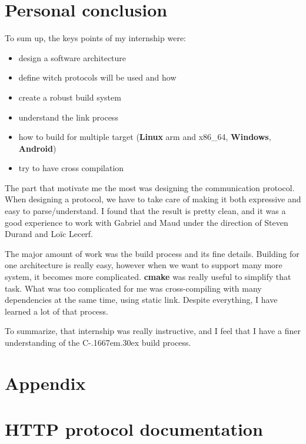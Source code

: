 \documentclass[a4paper,11pt]{custom}
\newcommand{\cmake}{\textbf{cmake}\xspace}
\newcommand{\linux}{\textbf{Linux}\xspace}
\newcommand{\win}{\textbf{Windows}\xspace}
\newcommand{\android}{\textbf{Android}\xspace}
\newcommand{\cpp}{%
  C\kern-.1667em\raise.30ex\hbox{\smaller{++}}%
  \spacefactor1000\xspace%
}
\begin{document}
\chapter{Personal conclusion}

To sum up, the keys points of my internship were:
\begin{multicols}{2}
\begin{itemize}
\item design a software architecture
\item define witch protocols will be used and how
\item create a robust build system
\item understand the link process
\item how to build for multiple target (\linux{} arm and x86\_64, \win, \android)
\item try to have cross compilation
\end{itemize}
\end{multicols}

The part that motivate me the most was designing the communication protocol.
When designing a protocol, we have to take care of making it both expressive and
easy to parse/understand. I found that the result is pretty clean, and it was a
good experience to work with Gabriel and Maud under the direction of Steven
Durand and Loïc Lecerf.

The major amount of work was the build process and its fine details. Building
for one architecture is really easy, however when we want to support many more
system, it becomes more complicated. \cmake{} was really useful to simplify that
task. What was too complicated for me was cross-compiling with many dependencies
at the same time, using static link. Despite everything, I have learned a lot of
that process.

To summarize, that internship was really instructive, and I feel that I have a
finer understanding of the \cpp{} build process.

\appendix

\chapter*{Appendix}

\chapter{HTTP protocol documentation}
\label{sec:documentation}

\end{document}
